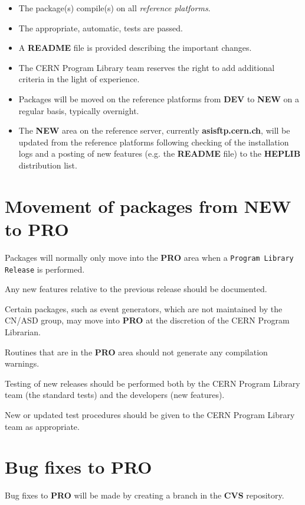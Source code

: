 \begin{itemize}
\item
The package(s) compile(s) on all {\it reference platforms}.
\item
The appropriate, automatic, tests are passed. 
\item
A {\bf README} file is provided describing the important
changes.
\item
The CERN Program Library team reserves the right to add
additional criteria in the light of experience.
\item
Packages will be moved on the reference platforms from {\bf DEV} to {\bf NEW}
on a regular basis, typically overnight.
\item
The {\bf NEW} area on the reference server, currently {\bf asisftp.cern.ch},
will be updated from the reference platforms following checking of the
installation logs and a posting of new features (e.g. the {\bf README} file)
to the {\bf HEPLIB} distribution list.
\end{itemize}

\section{Movement of packages from {\bf NEW} to {\bf PRO}}

Packages will normally only move into the {\bf PRO} area
when a {\tt Program Library Release} is performed.

Any new features relative to the previous release should 
be documented.

Certain packages, such as event generators, which are not
maintained by the CN/ASD group, may move into {\bf PRO}
at the discretion of the CERN Program Librarian.

Routines that are in the {\bf PRO} area should not generate
any compilation warnings.

Testing of new releases should be performed both by the CERN
Program Library team (the standard tests) and the developers
(new features).

New or updated test procedures should be given to the CERN Program Library
team as appropriate.

\section{Bug fixes to {\bf PRO}}

Bug fixes to {\bf PRO} will be made by creating a branch 
in the {\bf CVS} repository.

